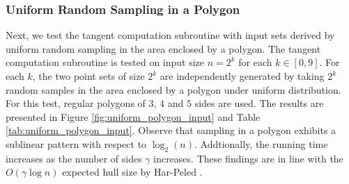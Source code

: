 \documentclass{article}
\newcommand{\figref}[1]{Figure \ref{#1}}
\newcommand{\tabref}[1]{Table \ref{#1}}
\begin{document}
\begin{figure}[h!]
    \begin{floatrow}
    \end{floatrow}
\end{figure}

\subsubsection{Uniform Random Sampling in a Polygon}

Next, we test the tangent computation subroutine with input sets derived by uniform random sampling in the area enclosed by a polygon. The tangent computation subroutine is tested on input size $n = 2^k$ for each $k \in [0, 9]$. For each $k$, the two point sets of size $2^k$ are independently generated by taking $2^k$ random samples in the area enclosed by a polygon under uniform distribution. For this test, regular polygons of $3$, $4$ and $5$ sides are used. The results are presented in \figref{fig:uniform_polygon_input} and \tabref{tab:uniform_polygon_input}. Observe that sampling in a polygon exhibits a sublinear pattern with respect to $\log_2(n)$. Addtionally, the running time increases as the number of sides $\gamma$ increases. These findings are in line with the $O(\gamma \log n)$ expected hull size by Har-Peled \cite{hp11}.
\end{document}
